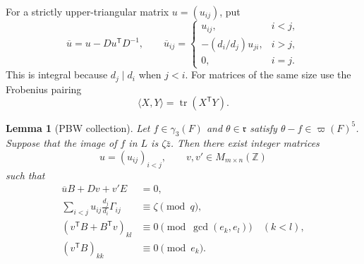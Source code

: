 \documentclass[11pt]{amsart}
\newtheorem{lemma}[theorem]{Lemma}
\theoremstyle{definition}
\theoremstyle{remark}
\newcommand{\Z}{\mathbb Z}
\newcommand{\gam}{\gamma}
\newcommand{\ww}{\varpi}
\newcommand{\tr}{\operatorname{tr}}
\newcommand{\pair}[2]{\langle #1,#2\rangle}
\begin{document}
For a strictly upper-triangular matrix \(u=(u_{ij})\), put
\begin{equation}\label{eq:ubar}
 \overline u=u-Du^{\mathsf T}D^{-1},\qquad
 \overline u_{ij}=
 \begin{cases}
  u_{ij},&i<j,\\
  -(d_i/d_j)u_{ji},&i>j,\\
  0,&i=j.
 \end{cases}
\end{equation}
This is integral because \(d_j\mid d_i\) when \(j<i\).  For matrices
of the same size use the Frobenius pairing
\[
                         \pair{X}{Y}=\tr(X^{\mathsf T}Y).
\]

\begin{lemma}[PBW collection]\label{lem:collection}
Let \(f\in\gam_3(F)\) and \(\theta\in\mathfrak r\) satisfy
\(\theta-f\in\ww(F)^5\).  Suppose that the image of \(f\) in \(L\) is
\(\zeta\bar z\).  Then there exist integer matrices
\[
 u=(u_{ij})_{i<j},\qquad v,v'\in M_{m\times n}(\Z)
\]
such that
\begin{align}
 \overline uB+Dv+v'E&=0, \tag{B}\label{eq:B}\\
 \sum_{i<j}u_{ij}\frac{d_j}{d_i}\Gamma_{ij}
   &\equiv\zeta\pmod q, \tag{Z}\label{eq:Z}\\
 (v^{\mathsf T}B+B^{\mathsf T}v)_{kl}
   &\equiv0\pmod{\gcd(e_k,e_l)}\quad(k<l), \tag{C1}\label{eq:C1}\\
 (v^{\mathsf T}B)_{kk}
   &\equiv0\pmod{e_k}. \tag{C2}\label{eq:C2}
\end{align}
\end{lemma}
\end{document}
